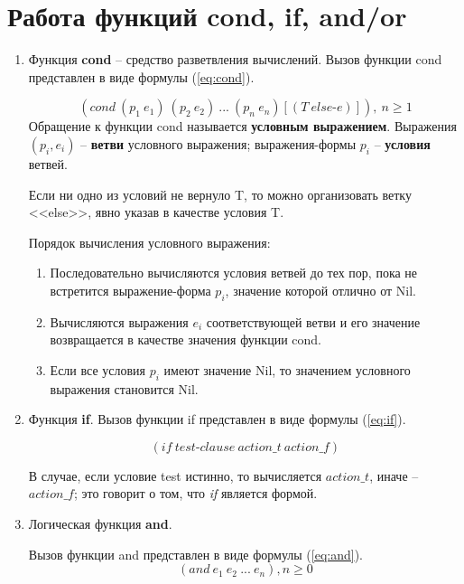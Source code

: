\section{Работа функций cond, if, and/or}
\begin{enumerate}
	
\item Функция \textbf{cond} -- средство разветвления вычислений.
Вызов функции cond представлен в виде формулы (\ref{eq:cond}).

\begin{equation}
	\label{eq:cond}
	(cond\ (p_1\ e_1)\ (p_2\ e_2)\ ...\ (p_n\ e_n) [(T\ else\text{-}e)]),\ n \geq 1
\end{equation}
\newpage
Обращение к функции cond называется \textbf{условным выражением}. Выражения $(p_i, e_i)$ -- \textbf{ветви} условного выражения; выражения-формы $p_i$ -- \textbf{условия} ветвей.

Если ни одно из условий не вернуло T, то можно организовать ветку <<else>>, явно указав в качестве условия T.

Порядок вычисления условного выражения:
\begin{enumerate}
	\item Последовательно вычисляются условия ветвей до тех пор, пока не встретится выражение-форма $p_i$, значение которой отлично от Nil.
	\item Вычисляются выражения $e_i$ соответствующей ветви и его значение возвращается в качестве значения функции cond.
	\item Если все условия $p_i$ имеют значение Nil, то значением условного выражения становится Nil.
\end{enumerate}

\item Функция \textbf{if}. Вызов функции if представлен в виде формулы (\ref{eq:if}).

 \begin{equation}
 	\label{eq:if}
 	(if\ test\text{-}clause\ action\_t\ action\_f)
 \end{equation}

В случае, если условие test истинно, то вычисляется $action\_t$, иначе -- $action\_f$; это говорит о том, что \textit{if} является формой. 

\item Логическая функция \textbf{and}. 

Вызов функции and представлен в виде формулы (\ref{eq:and}).
\begin{equation}
	\label{eq:and}
	(and\ e_1\ e_2\ ...\ e_n), n \geq 0
\end{equation}


\end{enumerate}
